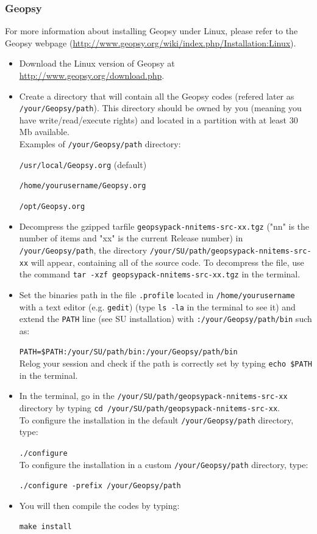 \documentclass[twoside,a4paper]{article}
\begin{document}
\subsubsection{Geopsy}
For more information about installing Geopsy under Linux, please refer to the Geopsy webpage (\url{http://www.geopsy.org/wiki/index.php/Installation:Linux}).
\begin{itemize}
\setlength\itemsep{2ex}
\setlength{\parindent}{5ex}
\item Download the Linux version of Geopsy at \url{http://www.geopsy.org/download.php}.

\item Create a directory that will contain all the Geopsy codes (refered later as \verb|/your/Geopsy/path|). This directory should be owned by you (meaning you have write/read/execute rights) and located in a partition with at least 30 Mb available.\\[1ex]
Examples of \verb|/your/Geopsy/path| directory:

\verb|/usr/local/Geopsy.org| (default)

\verb|/home/yourusername/Geopsy.org|

\verb|/opt/Geopsy.org|

\item Decompress the gzipped tarfile \verb|geopsypack-nnitems-src-xx.tgz| ("nn" is the number of items and "xx" is the current Release number) in \verb|/your/Geopsy/path|, the directory \verb|/your/SU/path/geopsypack-nnitems-src-xx| will appear, containing all of the source code. To decompress the file, use the command \verb|tar -xzf geopsypack-nnitems-src-xx.tgz| in the terminal.

\item Set the binaries path in the file \verb|.profile| located in \verb|/home/yourusername| with a text editor (e.g. \verb|gedit|) (type \verb|ls -la| in the terminal to see it) and extend the \verb|PATH| line (see SU installation) with \verb|:/your/Geopsy/path/bin| such as:

\verb|PATH=$PATH:/your/SU/path/bin:/your/Geopsy/path/bin|\\[1ex]
Relog your session and check if the path is correctly set by typing \verb|echo $PATH| in the terminal.

\item In the terminal, go in the \verb|/your/SU/path/geopsypack-nnitems-src-xx| directory by typing \verb|cd /your/SU/path/geopsypack-nnitems-src-xx|.\\[1ex]
To configure the installation in the default \verb|/your/Geopsy/path| directory, type:

\verb|./configure|\\[1ex]
To configure the installation in a custom \verb|/your/Geopsy/path| directory, type:

\verb|./configure -prefix /your/Geopsy/path|

\item You will then compile the codes by typing:

\verb|make install|
\end{itemize}
\end{document}
